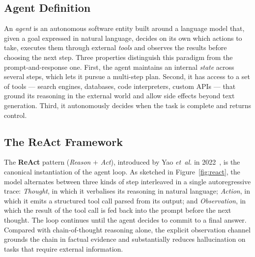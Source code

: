 \subsection{Agent Definition}
An \emph{agent} is an autonomous software entity built around a
language model that, given a goal expressed in natural language,
decides on its own which actions to take, executes them through external
\emph{tools} and observes the results before choosing the next step.
Three properties distinguish this paradigm from the prompt-and-response
one. First, the agent maintains an internal \emph{state} across several
steps, which lets it pursue a multi-step plan. Second, it has access
to a set of tools --- search engines, databases, code interpreters,
custom \acs{API}s --- that ground its reasoning in the external world
and allow side effects beyond text generation. Third, it autonomously
decides when the task is complete and returns control.

\subsection{The ReAct Framework}
The \textbf{ReAct} pattern (\emph{Reason} $+$ \emph{Act}), introduced by
Yao \emph{et~al.} in 2022~\cite{yao2023react}, is the canonical
instantiation of the agent loop. As sketched in Figure~\ref{fig:react},
the model alternates between three kinds of step interleaved in a
single autoregressive trace: \emph{Thought}, in which it verbalises its
reasoning in natural language; \emph{Action}, in which it emits a
structured tool call parsed from its output; and \emph{Observation},
in which the result of the tool call is fed back into the prompt before
the next thought. The loop continues until the agent decides to commit
to a final answer. Compared with chain-of-thought reasoning alone, the
explicit observation channel grounds the chain in factual evidence and
substantially reduces hallucination on tasks that require external
information.

